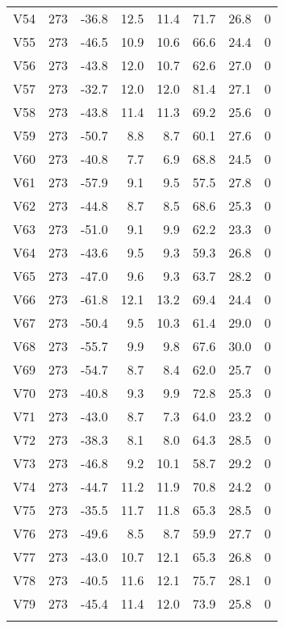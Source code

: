 {\begin{longtable}{lrrrrrrr}
  V54 & 273 & -36.8 & 12.5 & 11.4 &  71.7 & 26.8 & 0 \\ 
  V55 & 273 & -46.5 & 10.9 & 10.6 &  66.6 & 24.4 & 0 \\ 
  V56 & 273 & -43.8 & 12.0 & 10.7 &  62.6 & 27.0 & 0 \\ 
  V57 & 273 & -32.7 & 12.0 & 12.0 &  81.4 & 27.1 & 0 \\ 
  V58 & 273 & -43.8 & 11.4 & 11.3 &  69.2 & 25.6 & 0 \\ 
  V59 & 273 & -50.7 &  8.8 &  8.7 &  60.1 & 27.6 & 0 \\ 
  V60 & 273 & -40.8 &  7.7 &  6.9 &  68.8 & 24.5 & 0 \\ 
  V61 & 273 & -57.9 &  9.1 &  9.5 &  57.5 & 27.8 & 0 \\ 
  V62 & 273 & -44.8 &  8.7 &  8.5 &  68.6 & 25.3 & 0 \\ 
  V63 & 273 & -51.0 &  9.1 &  9.9 &  62.2 & 23.3 & 0 \\ 
  V64 & 273 & -43.6 &  9.5 &  9.3 &  59.3 & 26.8 & 0 \\ 
  V65 & 273 & -47.0 &  9.6 &  9.3 &  63.7 & 28.2 & 0 \\ 
  V66 & 273 & -61.8 & 12.1 & 13.2 &  69.4 & 24.4 & 0 \\ 
  V67 & 273 & -50.4 &  9.5 & 10.3 &  61.4 & 29.0 & 0 \\ 
  V68 & 273 & -55.7 &  9.9 &  9.8 &  67.6 & 30.0 & 0 \\ 
  V69 & 273 & -54.7 &  8.7 &  8.4 &  62.0 & 25.7 & 0 \\ 
  V70 & 273 & -40.8 &  9.3 &  9.9 &  72.8 & 25.3 & 0 \\ 
  V71 & 273 & -43.0 &  8.7 &  7.3 &  64.0 & 23.2 & 0 \\ 
  V72 & 273 & -38.3 &  8.1 &  8.0 &  64.3 & 28.5 & 0 \\ 
  V73 & 273 & -46.8 &  9.2 & 10.1 &  58.7 & 29.2 & 0 \\ 
  V74 & 273 & -44.7 & 11.2 & 11.9 &  70.8 & 24.2 & 0 \\ 
  V75 & 273 & -35.5 & 11.7 & 11.8 &  65.3 & 28.5 & 0 \\ 
  V76 & 273 & -49.6 &  8.5 &  8.7 &  59.9 & 27.7 & 0 \\ 
  V77 & 273 & -43.0 & 10.7 & 12.1 &  65.3 & 26.8 & 0 \\ 
  V78 & 273 & -40.5 & 11.6 & 12.1 &  75.7 & 28.1 & 0 \\ 
  V79 & 273 & -45.4 & 11.4 & 12.0 &  73.9 & 25.8 & 0 \\ 
  \hline
\label{tab:table4}
\end{longtable}
}
